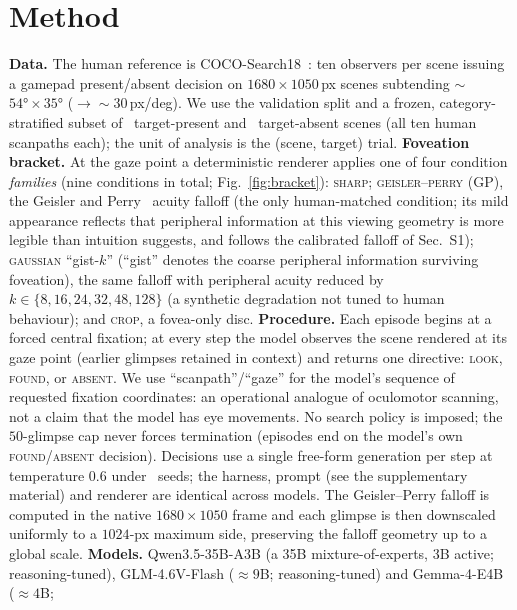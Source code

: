 \documentclass[runningheads]{llncs}
\begin{document}
\section{Method}
 \vspace{-3mm}
\textbf{Data.} The human reference is COCO-Search18~\cite{chen2021cocosearch18}: ten observers per scene
issuing a gamepad present/absent decision on $1680{\times}1050$\,px scenes subtending $\sim$$54°{\times}35°$
($\to\sim$$30$\,px/deg). We use the validation split and a frozen, category-stratified subset of
\NImagesTP\ target-present and \NImagesTA\ target-absent scenes (all ten human scanpaths each); the unit
of analysis is the (scene, target) trial. \textbf{Foveation bracket.} At the gaze point a deterministic
renderer applies one of four condition \emph{families} (nine conditions in total; Fig.~\ref{fig:bracket}): \textsc{sharp}; \textsc{geisler--perry}
(GP), the Geisler and Perry~\cite{geisler1998foveation} acuity falloff (the only human-matched
condition; its mild appearance reflects that peripheral information at this viewing geometry is more legible than intuition suggests, and follows the calibrated falloff of Sec.~S1); \textsc{gaussian} ``gist-$k$'' (``gist'' denotes the coarse peripheral information surviving foveation), the same falloff with peripheral
acuity reduced by $k\in\{8,16,24,32,48,128\}$ (a synthetic degradation not tuned to human behaviour); and
\textsc{crop}, a fovea-only disc. \textbf{Procedure.} Each episode begins at a forced central fixation; at
every step the model observes the scene rendered at its gaze point (earlier glimpses retained in context)
and returns one directive: \textsc{look}, \textsc{found}, or \textsc{absent}. We use ``scanpath''/``gaze'' for the model's sequence of requested fixation coordinates: an operational analogue of oculomotor scanning, not a claim that the model has eye movements. No search policy is
imposed; the $50$-glimpse cap never forces termination (episodes end on the model's own \textsc{found}/\textsc{absent} decision). Decisions use a single free-form
generation per step at temperature $0.6$ under \NSeeds\ seeds; the harness, prompt (see the supplementary material) and renderer are identical across models. The Geisler--Perry falloff is computed in the native $1680{\times}1050$ frame and each glimpse is then downscaled uniformly to a $1024$-px maximum side, preserving the falloff geometry up to a global scale. \textbf{Models.} Qwen3.5-35B-A3B (a 35B mixture-of-experts, 3B active;
reasoning-tuned), GLM-4.6V-Flash ($\approx$$9$B; reasoning-tuned) and Gemma-4-E4B ($\approx$$4$B;
\end{document}
